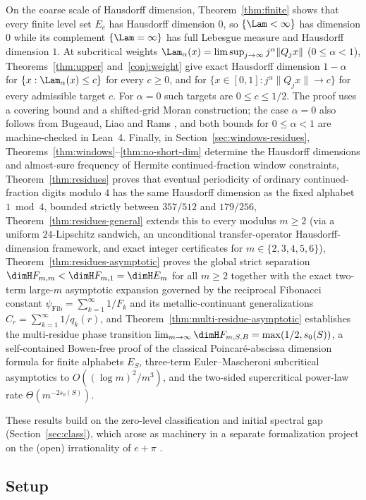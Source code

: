 On the coarse scale of Hausdorff dimension, Theorem~\ref{thm:finite} shows that
every finite level set $E_c$ has Hausdorff dimension $0$, so $\{\Lam<\infty\}$
has dimension $0$ while its complement $\{\Lam=\infty\}$ has full Lebesgue
measure and Hausdorff dimension $1$. At subcritical weights
$\Lam_\alpha(x)=\limsup_{j\to\infty}j^\alpha\|Q_jx\|$ ($0\le\alpha<1$),
Theorems~\ref{thm:upper} and~\ref{conj:weight} give exact Hausdorff dimension $1-\alpha$ for
$\{x:\Lam_\alpha(x)\le c\}$ for every $c\ge0$, and for
$\{x\in[0,1]:j^\alpha\|Q_jx\|\to c\}$ for every admissible target $c$.
For $\alpha=0$ such targets are $0\le c\le 1/2$.
The proof uses a covering bound and a shifted-grid Moran construction;
the case $\alpha=0$ also follows from Bugeaud, Liao and Rams \cite{BLR}, and
both bounds for $0\le\alpha<1$ are machine-checked in Lean~4. Finally, in
Section~\ref{sec:windows-residues}, Theorems~\ref{thm:windows}--\ref{thm:no-short-dim}
determine the Hausdorff dimensions and almost-sure frequency of Hermite
continued-fraction window constraints, Theorem~\ref{thm:residues} proves
that eventual periodicity of ordinary continued-fraction digits modulo $4$ has
the same Hausdorff dimension as the fixed alphabet $1\bmod 4$, bounded strictly
between $357/512$ and $179/256$, Theorem~\ref{thm:residues-general} extends this
to every modulus $m\ge2$ (via a uniform $24$-Lipschitz sandwich, an unconditional
transfer-operator Hausdorff-dimension framework, and exact integer certificates
for $m\in\{2,3,4,5,6\}$), Theorem~\ref{thm:residues-asymptotic} proves the
global strict separation $\dimH F_{m,m}<\dimH F_{m,1}=\dimH E_m$ for all $m\ge2$
together with the exact two-term large-$m$ asymptotic expansion governed by the
reciprocal Fibonacci constant $\psi_{\mathrm{Fib}}=\sum_{k=1}^\infty 1/F_k$ and
its metallic-continuant generalizations $C_r=\sum_{k=1}^\infty 1/q_k(r)$, and
Theorem~\ref{thm:multi-residue-asymptotic} establishes the multi-residue
phase transition $\lim_{m\to\infty}\dimH F_{m,S,B}=\max(1/2,s_0(S))$, a
self-contained Bowen-free proof of the classical Poincar\'e-abscissa dimension
formula for finite alphabets $E_S$,
three-term Euler--Mascheroni subcritical asymptotics to $O((\log m)^2/m^3)$,
and the two-sided supercritical power-law rate $\Theta(m^{-2s_0(S)})$.

These results build on the zero-level classification and initial spectral gap
(Section~\ref{sec:class}), which arose as machinery in a separate formalization
project on the (open) irrationality of $e+\pi$ \cite{Phase1}.

\subsection{Setup}

